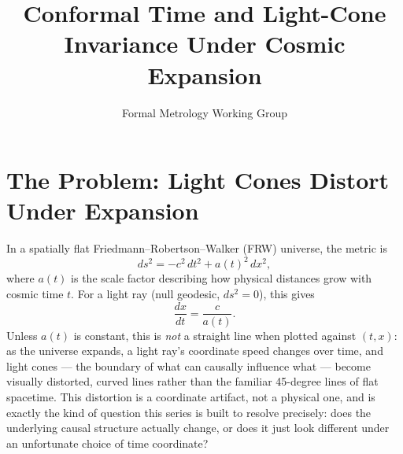 \documentclass[10pt,journal,compsoc]{IEEEtran}
\begin{document}
\title{Conformal Time and Light-Cone Invariance Under Cosmic Expansion}
\author{Formal Metrology Working Group}


\maketitle

\section{The Problem: Light Cones Distort Under Expansion}
In a spatially flat Friedmann--Robertson--Walker (FRW) universe, the metric is
\begin{equation}
    ds^2 = -c^2\,dt^2 + a(t)^2\,dx^2,
\end{equation}
where $a(t)$ is the scale factor describing how physical distances grow with cosmic time $t$. For a light ray (null geodesic, $ds^2=0$), this gives
\begin{equation}
    \frac{dx}{dt} = \frac{c}{a(t)}.
\end{equation}
Unless $a(t)$ is constant, this is \emph{not} a straight line when plotted against $(t,x)$: as the universe expands, a light ray's coordinate speed changes over time, and light cones — the boundary of what can causally influence what — become visually distorted, curved lines rather than the familiar 45-degree lines of flat spacetime. This distortion is a coordinate artifact, not a physical one, and is exactly the kind of question this series is built to resolve precisely: does the underlying causal structure actually change, or does it just look different under an unfortunate choice of time coordinate?
\end{document}
